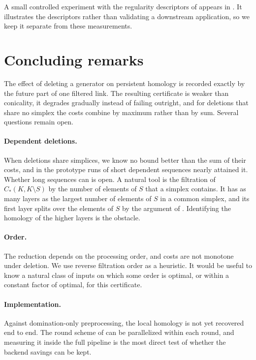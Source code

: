 \documentclass[11pt,letterpaper]{article}
\theoremstyle{definition}
\begin{document}
A small controlled experiment with the regularity descriptors of
 appears in . It illustrates the
descriptors rather than validating a downstream application, so we keep it
separate from these measurements.

\FloatBarrier

\section{Concluding remarks}
\label{sec:conclusion}

The effect of deleting a generator on persistent homology is recorded exactly
by the future part of one filtered link. The resulting certificate is weaker
than conicality, it degrades gradually instead of failing outright, and for
deletions that share no simplex the costs combine by maximum rather than by
sum. Several questions remain open.

\paragraph{Dependent deletions.}
When deletions share simplices, we know no bound better than the sum of their
costs, and in the prototype runs of  short dependent
sequences nearly attained it. Whether long sequences can is open. A natural tool is the
filtration of $C_*(K,K\setminus S)$ by the number of elements of $S$ that a
simplex contains. It has as many layers as the largest number of elements of
$S$ in a common simplex, and its first layer splits over the elements of $S$
by the argument of . Identifying the homology of the
higher layers is the obstacle.

\paragraph{Order.}
The reduction depends on the processing order, and costs are not monotone
under deletion. We use reverse filtration order as a heuristic. It would be
useful to know a natural class of inputs on which some order is optimal, or
within a constant factor of optimal, for this certificate.

\paragraph{Implementation.}
Against domination-only preprocessing, the local homology is not yet
recovered end to end. The round scheme of  can be parallelized
within each round, and measuring it inside the full pipeline is the most
direct test of whether the backend savings can be kept.
\end{document}
